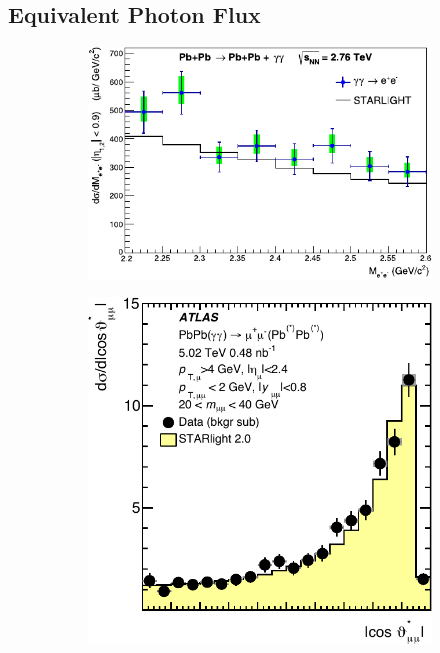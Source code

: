 \documentclass[12pt,epjc3]{svjour3}\sloppy
\begin{document}
\subsection{Equivalent Photon Flux}

\begin{figure}
    \centering
    \begin{subfigure}{.60\textwidth}
      \centering
      \includegraphics[width=.99\linewidth]{fig/fig_5-crop.pdf}
      \caption{}
    \end{subfigure}%
    \begin{subfigure}{.40\textwidth}
      \centering
      \includegraphics[width=.99\linewidth]{fig/ATLAS_Fig_1b-crop.pdf}

\end{subfigure}
\end{figure}
\end{document}
